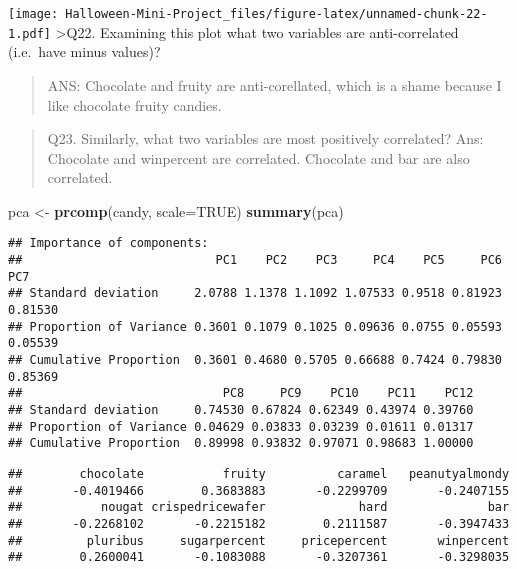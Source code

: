 \documentclass[
]{article}
\newenvironment{Shaded}{\begin{snugshade}}{\end{snugshade}}
\newcommand{\AttributeTok}[1]{\textcolor[rgb]{0.13,0.29,0.53}{#1}}
\newcommand{\ConstantTok}[1]{\textcolor[rgb]{0.56,0.35,0.01}{#1}}
\newcommand{\DecValTok}[1]{\textcolor[rgb]{0.00,0.00,0.81}{#1}}
\newcommand{\FunctionTok}[1]{\textcolor[rgb]{0.13,0.29,0.53}{\textbf{#1}}}
\newcommand{\NormalTok}[1]{#1}
\newcommand{\OtherTok}[1]{\textcolor[rgb]{0.56,0.35,0.01}{#1}}
\newcommand{\SpecialCharTok}[1]{\textcolor[rgb]{0.81,0.36,0.00}{\textbf{#1}}}
\begin{document}
\texttt{[image: Halloween-Mini-Project\_files/figure-latex/unnamed-chunk-22-1.pdf]}
\textgreater Q22. Examining this plot what two variables are
anti-correlated (i.e.~have minus values)?

\begin{quote}
ANS: Chocolate and fruity are anti-corellated, which is a shame because
I like chocolate fruity candies.
\end{quote}

\begin{quote}
Q23. Similarly, what two variables are most positively correlated? Ans:
Chocolate and winpercent are correlated. Chocolate and bar are also
correlated.
\end{quote}

\begin{Shaded}
\begin{Highlighting}[]
\NormalTok{pca }\OtherTok{\textless{}{-}} \FunctionTok{prcomp}\NormalTok{(candy, }\AttributeTok{scale=}\ConstantTok{TRUE}\NormalTok{)}
\FunctionTok{summary}\NormalTok{(pca)}
\end{Highlighting}
\end{Shaded}

\begin{verbatim}
## Importance of components:
##                           PC1    PC2    PC3     PC4    PC5     PC6     PC7
## Standard deviation     2.0788 1.1378 1.1092 1.07533 0.9518 0.81923 0.81530
## Proportion of Variance 0.3601 0.1079 0.1025 0.09636 0.0755 0.05593 0.05539
## Cumulative Proportion  0.3601 0.4680 0.5705 0.66688 0.7424 0.79830 0.85369
##                            PC8     PC9    PC10    PC11    PC12
## Standard deviation     0.74530 0.67824 0.62349 0.43974 0.39760
## Proportion of Variance 0.04629 0.03833 0.03239 0.01611 0.01317
## Cumulative Proportion  0.89998 0.93832 0.97071 0.98683 1.00000
\end{verbatim}

\begin{Shaded}
\end{Shaded}

\begin{verbatim}
##        chocolate           fruity          caramel   peanutyalmondy 
##       -0.4019466        0.3683883       -0.2299709       -0.2407155 
##           nougat crispedricewafer             hard              bar 
##       -0.2268102       -0.2215182        0.2111587       -0.3947433 
##         pluribus     sugarpercent     pricepercent       winpercent 
##        0.2600041       -0.1083088       -0.3207361       -0.3298035
\end{verbatim}
\end{document}
